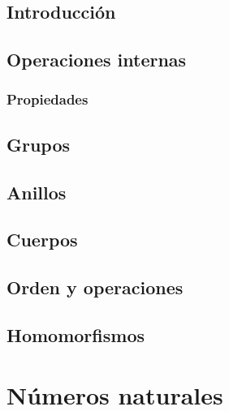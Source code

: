 \documentclass[10pt]{book}
\begin{document}
  \section{Introducción}
  


  \section{Operaciones internas}
  

    \subsection{Propiedades}
    


  \section{Grupos}
  


  \section{Anillos}
  


  \section{Cuerpos}
  


  \section{Orden y operaciones}
  


  \section{Homomorfismos}
  





\chapter{Números naturales}%
\label{ch:naturales}
\end{document}
